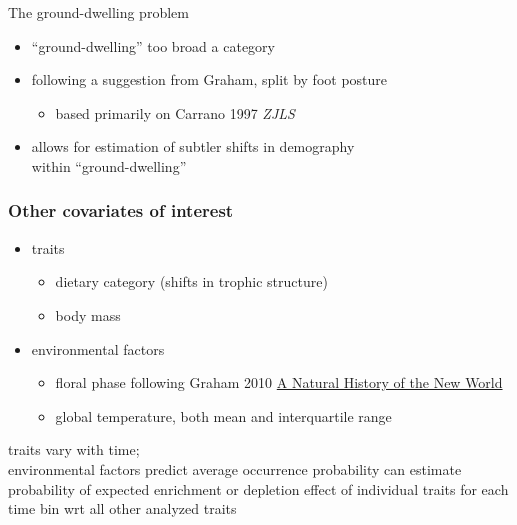 \documentclass{beamer}
\begin{document}
\begin{frame}
  \begin{block}{The ground-dwelling problem}
    \begin{itemize}
      \item ``ground-dwelling'' too broad a category
      \item following a suggestion from Graham, split by foot posture
        \begin{itemize}
          \item based primarily on Carrano 1997 \textit{ZJLS}
        \end{itemize}
      \item allows for estimation of subtler shifts in demography \\within ``ground-dwelling''
    \end{itemize}
  \end{block}
\end{frame}

\begin{frame}
  \frametitle{Other covariates of interest}
  \begin{itemize}
    \item traits
      \begin{itemize}
        \item dietary category (shifts in trophic structure)
        \item body mass
      \end{itemize}
    \item environmental factors
      \begin{itemize}
        \item floral phase following Graham 2010 \underline{A Natural History of the New World}
        \item global temperature, both mean and interquartile range
      \end{itemize}
  \end{itemize}

  \begin{block}{traits vary with time; \\environmental factors predict average occurrence probability}
    can estimate probability of expected enrichment or depletion effect of individual traits for each time bin wrt all other analyzed traits
  \end{block}
\end{frame}
\end{document}

